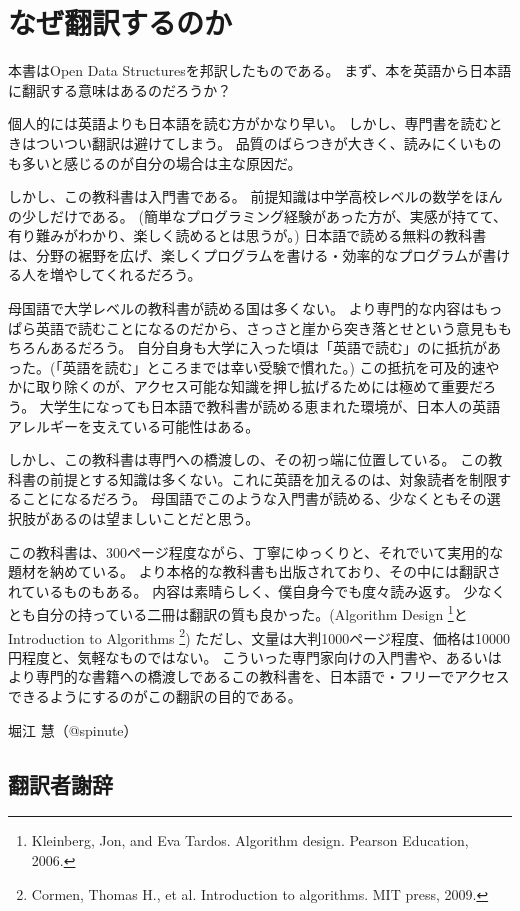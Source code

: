 \chapter*{なぜ翻訳するのか}
本書はOpen Data Structuresを邦訳したものである。
まず、本を英語から日本語に翻訳する意味はあるのだろうか？

個人的には英語よりも日本語を読む方がかなり早い。
しかし、専門書を読むときはついつい翻訳は避けてしまう。
品質のばらつきが大きく、読みにくいものも多いと感じるのが自分の場合は主な原因だ。

しかし、この教科書は入門書である。
前提知識は中学高校レベルの数学をほんの少しだけである。
(簡単なプログラミング経験があった方が、実感が持てて、有り難みがわかり、楽しく読めるとは思うが。)
日本語で読める無料の教科書は、分野の裾野を広げ、楽しくプログラムを書ける・効率的なプログラムが書ける人を増やしてくれるだろう。

母国語で大学レベルの教科書が読める国は多くない。
より専門的な内容はもっぱら英語で読むことになるのだから、さっさと崖から突き落とせという意見ももちろんあるだろう。
自分自身も大学に入った頃は「英語で読む」のに抵抗があった。(「英語を読む」ところまでは幸い受験で慣れた。)
この抵抗を可及的速やかに取り除くのが、アクセス可能な知識を押し拡げるためには極めて重要だろう。
大学生になっても日本語で教科書が読める恵まれた環境が、日本人の英語アレルギーを支えている可能性はある。

しかし、この教科書は専門への橋渡しの、その初っ端に位置している。
この教科書の前提とする知識は多くない。これに英語を加えるのは、対象読者を制限することになるだろう。
母国語でこのような入門書が読める、少なくともその選択肢があるのは望ましいことだと思う。

この教科書は、300ページ程度ながら、丁寧にゆっくりと、それでいて実用的な題材を納めている。
より本格的な教科書も出版されており、その中には翻訳されているものもある。
内容は素晴らしく、僕自身今でも度々読み返す。
少なくとも自分の持っている二冊は翻訳の質も良かった。(Algorithm Design \footnote{Kleinberg, Jon, and Eva Tardos. Algorithm design. Pearson Education, 2006.}とIntroduction to Algorithms \footnote{Cormen, Thomas H., et al. Introduction to algorithms. MIT press, 2009.})
ただし、文量は大判1000ページ程度、価格は10000円程度と、気軽なものではない。
こういった専門家向けの入門書や、あるいはより専門的な書籍への橋渡しであるこの教科書を、日本語で・フリーでアクセスできるようにするのがこの翻訳の目的である。

堀江 慧（@spinute）

\section*{翻訳者謝辞}

